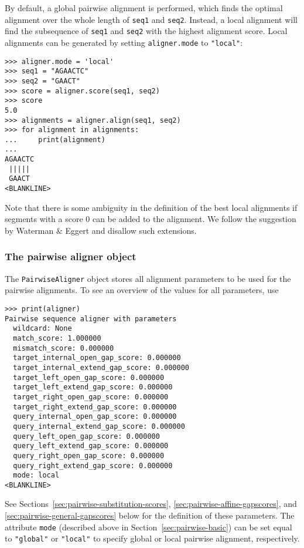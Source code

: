By default, a global pairwise alignment is performed, which finds the optimal
alignment over the whole length of \verb+seq1+ and \verb+seq2+.
Instead, a local alignment will find the subsequence of
\verb+seq1+ and \verb+seq2+ with the highest alignment score.
Local alignments can be generated by setting \verb+aligner.mode+ to
\verb+"local"+:

\begin{verbatim}
>>> aligner.mode = 'local'
>>> seq1 = "AGAACTC"
>>> seq2 = "GAACT"
>>> score = aligner.score(seq1, seq2)
>>> score
5.0
>>> alignments = aligner.align(seq1, seq2)
>>> for alignment in alignments:
...     print(alignment)
...
AGAACTC
 ||||| 
 GAACT 
<BLANKLINE>
\end{verbatim}

Note that there is some ambiguity in the definition of the best local alignments if segments with a score 0 can be added to the alignment. We follow the suggestion by Waterman \& Eggert \cite{waterman1987} and disallow such extensions.

\subsubsection{The pairwise aligner object}
\label{sec:pairwise-aligner}

The \verb+PairwiseAligner+ object stores all alignment parameters to be used
for the pairwise alignments. To see an overview of the values for all parameters, use

\begin{verbatim}
>>> print(aligner)
Pairwise sequence aligner with parameters
  wildcard: None
  match_score: 1.000000
  mismatch_score: 0.000000
  target_internal_open_gap_score: 0.000000
  target_internal_extend_gap_score: 0.000000
  target_left_open_gap_score: 0.000000
  target_left_extend_gap_score: 0.000000
  target_right_open_gap_score: 0.000000
  target_right_extend_gap_score: 0.000000
  query_internal_open_gap_score: 0.000000
  query_internal_extend_gap_score: 0.000000
  query_left_open_gap_score: 0.000000
  query_left_extend_gap_score: 0.000000
  query_right_open_gap_score: 0.000000
  query_right_extend_gap_score: 0.000000
  mode: local
<BLANKLINE>
\end{verbatim}
See Sections~\ref{sec:pairwise-substitution-scores}, \ref{sec:pairwise-affine-gapscores}, and \ref{sec:pairwise-general-gapscores} below for the definition of these
parameters. The attribute \verb+mode+ (described above in Section~\ref{sec:pairwise-basic}) can be set equal to \verb+"global"+ or \verb+"local"+ to specify global or local pairwise alignment, respectively.

